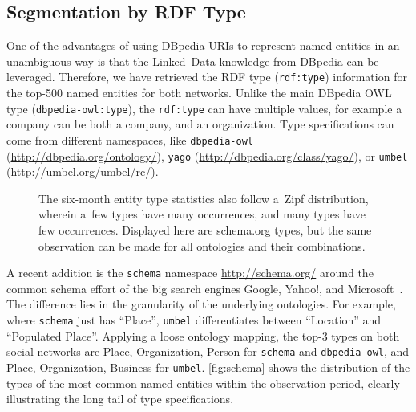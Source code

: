\documentclass{iosart2c}
\begin{document}
\subsection{Segmentation by RDF Type}
One of the advantages of using DBpedia URIs to represent named entities in an unambiguous way is that the Linked~Data knowledge from DBpedia can be leveraged.
Therefore, we have retrieved the RDF type (\texttt{rdf:type}) information for the top-500 named entities for both networks.
Unlike the main DBpedia OWL type (\texttt{dbpedia-owl:type}), the \texttt{rdf:type} can have multiple values, for example a company can be both a company, and an organization.
Type specifications can come from different namespaces, like \texttt{dbpedia-owl} (\url{http://dbpedia.org/ontology/}), \texttt{yago} (\url{http://dbpedia.org/class/yago/}), or \texttt{umbel} (\url{http://umbel.org/umbel/rc/}).

\begin{figure}
  \centering
\caption{The six-month entity type statistics also follow a~Zipf distribution, wherein a~few types have many occurrences, and many types have few occurrences. Displayed here are schema.org types, but the same observation can be made for all ontologies and their combinations.}
\label{fig:schema}
\end{figure}

A recent addition is the \texttt{schema} namespace \url{http://schema.org/} around the common schema effort of the big search engines Google, Yahoo!, and Microsoft~\cite{schemaorg}.
The difference lies in the granularity of the underlying ontologies.
For example, where \texttt{schema} just has ``Place'', \texttt{umbel} differentiates between ``Location'' and ``Populated Place''.
Applying a loose ontology mapping, the top-3 types on both social networks are Place, Organization, Person for \texttt{schema} and \texttt{dbpedia-owl}, and Place, Organization, Business for \texttt{umbel}.
\autoref{fig:schema} shows the distribution of the types of the most common named entities within the observation period, clearly illustrating the long tail of type specifications.
\end{document}
